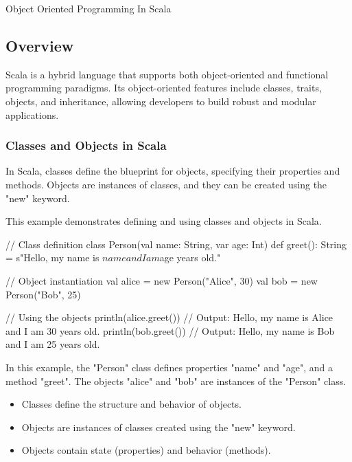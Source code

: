 \begin{notes}{Object Oriented Programming In Scala}
    \subsection*{Overview}

    Scala is a hybrid language that supports both object-oriented and functional programming paradigms. Its object-oriented features include classes, traits, objects, and inheritance, allowing developers to build robust and modular applications.
    
    \subsubsection*{Classes and Objects in Scala}
    
    In Scala, classes define the blueprint for objects, specifying their properties and methods. Objects are instances of classes, and they can be created using the "new" keyword.
    
    \begin{highlight}
    
        This example demonstrates defining and using classes and objects in Scala.
    
    \begin{code}[Scala]
    // Class definition
    class Person(val name: String, var age: Int) {
        def greet(): String = s"Hello, my name is $name and I am $age years old."
    }
    
    // Object instantiation
    val alice = new Person("Alice", 30)
    val bob = new Person("Bob", 25)
    
    // Using the objects
    println(alice.greet())  // Output: Hello, my name is Alice and I am 30 years old.
    println(bob.greet())    // Output: Hello, my name is Bob and I am 25 years old.
    \end{code}
    
        In this example, the "Person" class defines properties "name" and "age", and a method "greet". The objects "alice" and "bob" are instances of the "Person" class.
    
        \begin{itemize}
            \item Classes define the structure and behavior of objects.
            \item Objects are instances of classes created using the "new" keyword.
            \item Objects contain state (properties) and behavior (methods).
        \end{itemize}
    

\end{highlight}
\end{notes}
